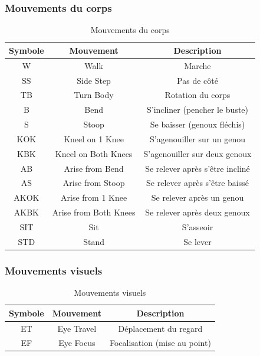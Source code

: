 \documentclass[a4paper,12pt]{article}
\begin{document}
\subsubsection{Mouvements du corps}

\begin{table}[ht]
\centering
\begin{tabular}{|c|c|c|}
\hline
\textbf{Symbole} & \textbf{Mouvement} & \textbf{Description} \\
\hline
W & Walk & Marche \\
SS & Side Step & Pas de côté \\
TB & Turn Body & Rotation du corps \\
B & Bend & S'incliner (pencher le buste) \\
S & Stoop & Se baisser (genoux fléchis) \\
KOK & Kneel on 1 Knee & S'agenouiller sur un genou \\
KBK & Kneel on Both Knees & S'agenouiller sur deux genoux \\
AB & Arise from Bend & Se relever après s'être incliné \\
AS & Arise from Stoop & Se relever après s'être baissé \\
AKOK & Arise from 1 Knee & Se relever après un genou \\
AKBK & Arise from Both Knees & Se relever après deux genoux \\
SIT & Sit & S'asseoir \\
STD & Stand & Se lever \\
\hline
\end{tabular}
\caption{Mouvements du corps}
\end{table}

\subsubsection{Mouvements visuels}

\begin{table}[ht]
\centering
\begin{tabular}{|c|c|c|}
\hline
\textbf{Symbole} & \textbf{Mouvement} & \textbf{Description} \\
\hline
ET & Eye Travel & Déplacement du regard \\
EF & Eye Focus & Focalisation (mise au point) \\
\hline
\end{tabular}
\caption{Mouvements visuels}
\end{table}
\end{document}
